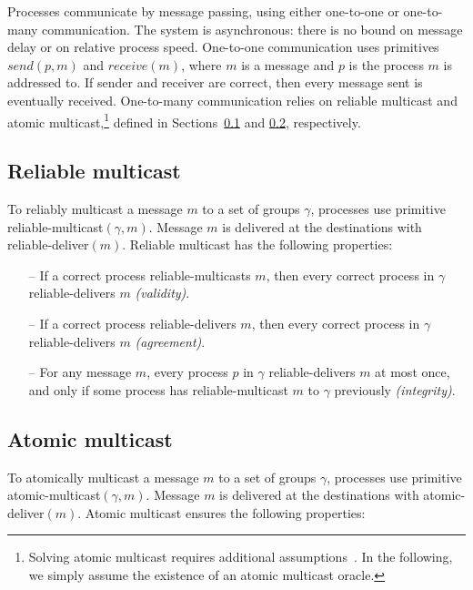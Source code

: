 \documentclass[11pt]{article}
\newcommand{\rmcast}{reliable-multicast}
\newcommand{\rmdel}{reliable-deliver}
\newcommand{\amcast}{atomic-multicast}
\newcommand{\amdel}{atomic-deliver}
\begin{document}
Processes communicate by message passing, using either one-to-one or one-to-many communication.
The system is asynchronous: there is no bound on message delay or on relative process speed.
One-to-one communication uses primitives $send(p,m)$ and $receive(m)$, where $m$ is a message and $p$ is the process $m$ is addressed to.
If sender and receiver are correct, then every message sent is eventually received.
One-to-many communication relies on reliable multicast and atomic multicast,\footnote{Solving atomic multicast requires additional assumptions~\cite{CT96,FLP85}. In the following, we simply assume the existence of an atomic multicast oracle.}
defined in Sections~\ref{sec:rmcast} and \ref{sec:amcast}, respectively.


\subsection{Reliable multicast}
\label{sec:rmcast}

To reliably multicast a message $m$ to a set of groups $\gamma$, processes use primitive \rmcast$(\gamma, m)$.
Message $m$ is delivered at the destinations with \rmdel$(m)$.
Reliable multicast has the following properties:

\begin{itemize}

    \item[--] If a correct process \rmcast{}s $m$, then every correct process in $\gamma$ \rmdel{}s $m$ \emph{(validity)}.

    \item[--] If a correct process \rmdel{}s $m$, then every correct process in $\gamma$ \rmdel{}s $m$ \emph{(agreement)}.

    \item[--] For any message $m$, every process $p$ in $\gamma$ \rmdel{}s $m$ at most once, and only if some process has \rmcast{} $m$  to $\gamma$ previously \emph{(integrity)}.

\end{itemize}

\subsection{Atomic multicast}
\label{sec:amcast}

To atomically multicast a message $m$ to a set of groups $\gamma$, processes use primitive \amcast$(\gamma, m)$.
Message $m$ is delivered at the destinations with \amdel$(m)$.
Atomic multicast ensures the following properties:
\end{document}
